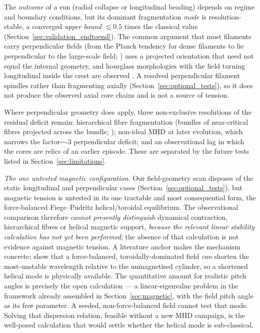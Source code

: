 \documentclass[usenatbib,twoside,twocolumn]{mnras}
\begin{document}
The \emph{outcome} of a run (radial collapse or longitudinal beading) depends on regime and boundary conditions, but its dominant fragmentation \emph{mode} is resolution-stable, a converged \emph{upper bound} $\lesssim0.5$ times the classical value (Section~\ref{sec:validation_endtoend}). The common argument that most filaments carry perpendicular fields (from the Planck tendency for dense filaments to lie perpendicular to the large-scale field; \citealt{Planck2016}) uses a projected orientation that need not equal the internal geometry, and hourglass morphologies with the field turning longitudinal inside the crest are observed \citep{Jadhav2026}. A resolved perpendicular filament spindles rather than fragmenting axially (Section~\ref{sec:optional_tests}), so it does not produce the observed axial core chains and is not a source of tension.

Where perpendicular geometry does apply, three non-exclusive resolutions of the residual deficit remain: hierarchical fibre fragmentation (bundles of near-critical fibres projected across the bundle; \citealt{Hacar2013,Hacar2018,Yang2024}); non-ideal MHD at later evolution, which narrows the factor-$\sim3$ perpendicular deficit; and an observational lag in which the cores are relics of an earlier episode. These are separated by the future tests listed in Section~\ref{sec:limitations}.

\emph{The one untested magnetic configuration.} Our field-geometry scan disposes of the static longitudinal and perpendicular cases (Section~\ref{sec:optional_tests}), but magnetic tension is untested in its one tractable and most consequential form, the force-balanced Fiege--Pudritz helical/toroidal equilibrium. The observational comparison therefore \emph{cannot presently distinguish} dynamical contraction, hierarchical fibres or helical magnetic support, \emph{because the relevant linear stability calculation has not yet been performed}; the absence of that calculation is not evidence against magnetic tension. A literature anchor makes the mechanism concrete: \citet{Fiege2000} show that a force-balanced, toroidally-dominated field \emph{can} shorten the most-unstable wavelength relative to the unmagnetised cylinder, so a shortened helical mode is physically available. The quantitative amount for realistic pitch angles is precisely the open calculation --- a linear-eigenvalue problem in the \citet{Nakamura1993} framework already assembled in Section~\ref{sec:magnetic}, with the field pitch angle as its free parameter. A seeded, non-force-balanced field cannot test that mode. Solving that dispersion relation, feasible without a new MHD campaign, is the well-posed calculation that would settle whether the helical mode is sub-classical.
\end{document}
